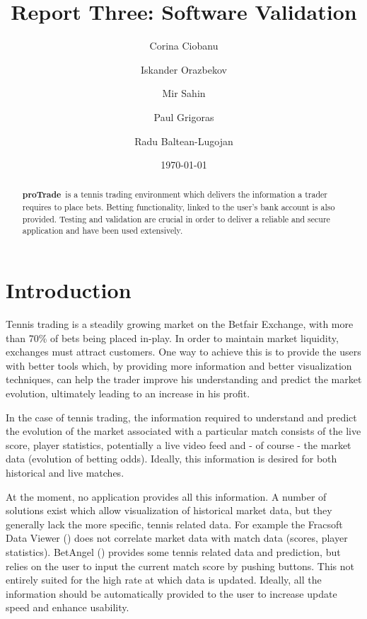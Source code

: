\documentclass[10pt]{article}
\newcommand{\nm}{{\bf proTrade}}
\newcommand{\nmsp}{{\nm \ }}
\begin{document}
\title{Report Three: Software Validation}

\author{Corina Ciobanu \and Iskander Orazbekov \and Mir Sahin \and Paul Grigoras \and Radu Baltean-Lugojan}

\date{\today}         %

\maketitle            %

\clearpage

\begin{abstract}
  \nmsp is a tennis trading environment which delivers the information a trader requires to place bets. Betting functionality, linked to the user's bank account is also provided. Testing and validation are crucial in order to deliver a reliable and secure application and have been used extensively.
\end{abstract}

\clearpage

\tableofcontents

\clearpage

\section{Introduction}
Tennis trading is a steadily growing market on the Betfair Exchange, with more than 70\% of bets being placed in-play. In order to maintain market liquidity, exchanges must attract customers. One way to achieve this is to provide the users with better tools which, by providing more information and better visualization techniques, can help the trader improve his understanding and predict the market evolution, ultimately leading to an increase in his profit.

In the case of tennis trading, the information required to understand and predict the evolution of the market associated with a particular match consists of the live score, player statistics, potentially a live video feed and - of course - the market data (evolution of betting odds). Ideally, this information is desired for both historical and live matches.

At the moment, no application provides all this information. A number of solutions exist which allow visualization of historical market data, but they generally lack the more specific, tennis related data. For example the Fracsoft Data Viewer (\cite{site-fracsoft}) does not correlate market data with match data (scores, player statistics). BetAngel (\cite{site-betangel}) provides some tennis related data and prediction, but relies on the user to input the current match score by pushing buttons. This not entirely suited for the high rate at which data is updated. Ideally, all the information should be automatically provided to the user to increase update speed and enhance usability.
\end{document}
